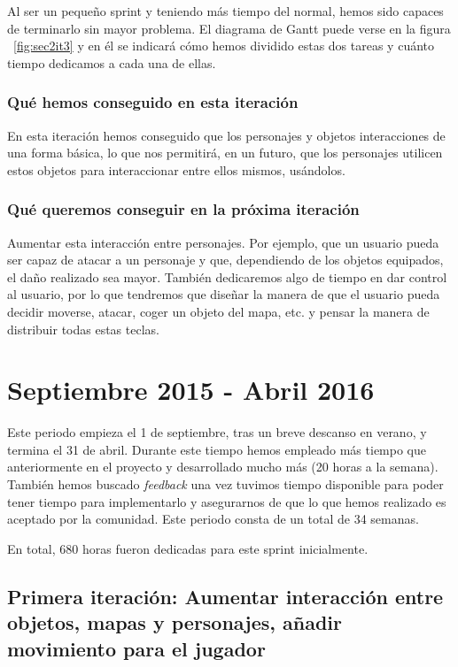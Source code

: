Al ser un pequeño sprint y teniendo más tiempo del normal, hemos sido capaces de terminarlo sin mayor problema. El diagrama de Gantt puede verse en la figura ~\ref{fig:sec2it3} y en él se indicará cómo hemos dividido estas dos tareas y cuánto tiempo dedicamos a cada una de ellas.

\subsubsection{Qué hemos conseguido en esta iteración}

En esta iteración hemos conseguido que los personajes y objetos interacciones de una forma básica, lo que nos permitirá, en un futuro, que los personajes utilicen estos objetos para interaccionar entre ellos mismos, usándolos.

\subsubsection{Qué queremos conseguir en la próxima iteración}

Aumentar esta interacción entre personajes. Por ejemplo, que un usuario pueda ser capaz de atacar a un personaje y que, dependiendo de los objetos equipados, el daño realizado sea mayor. 
También dedicaremos algo de tiempo en dar control al usuario, por lo que tendremos que diseñar la manera de que el usuario pueda decidir moverse, atacar, coger un objeto del mapa, etc. y pensar la manera de distribuir todas estas teclas.

\section{Septiembre 2015 - Abril 2016}

Este periodo empieza el 1 de septiembre, tras un breve descanso en verano, y termina el 31 de abril. Durante este tiempo hemos empleado más tiempo que anteriormente en el proyecto y desarrollado mucho más (20 horas a la semana). También hemos buscado \textit{feedback} una vez tuvimos tiempo disponible para poder tener tiempo para implementarlo y asegurarnos de que lo que hemos realizado es aceptado por la comunidad. 
Este periodo consta de un total de 34 semanas.

En total, 680 horas fueron dedicadas para este sprint inicialmente.

\subsection{Primera iteración: Aumentar interacción entre objetos, mapas y personajes, añadir movimiento para el jugador}

